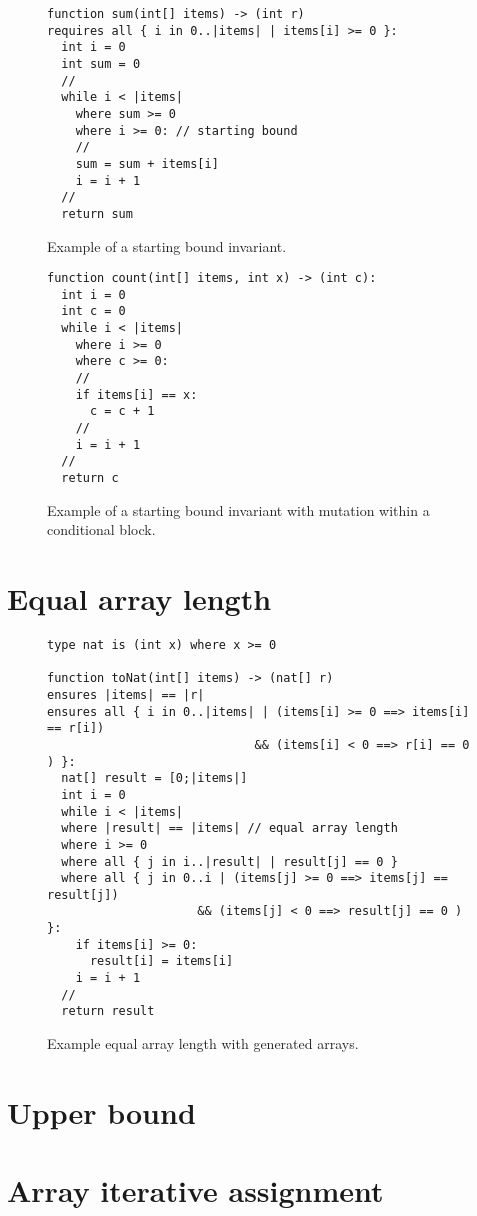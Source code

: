 \begin{appendices}
\begin{figure}[ht]
\begin{lstlisting}
function sum(int[] items) -> (int r)
requires all { i in 0..|items| | items[i] >= 0 }:
  int i = 0
  int sum = 0
  //
  while i < |items|
    where sum >= 0
    where i >= 0: // starting bound
    //
    sum = sum + items[i]
    i = i + 1
  //
  return sum
\end{lstlisting}
\caption{Example of a starting bound invariant.}
\end{figure}

\begin{figure}[ht]
\begin{lstlisting}
function count(int[] items, int x) -> (int c):
  int i = 0
  int c = 0
  while i < |items|
    where i >= 0
    where c >= 0:
    //
    if items[i] == x:
      c = c + 1
    //
    i = i + 1
  //
  return c
\end{lstlisting}
\caption{Example of a starting bound invariant with mutation within a conditional block.}
\end{figure}

\section{Equal array length}

\begin{figure}[ht]
\begin{lstlisting}
type nat is (int x) where x >= 0

function toNat(int[] items) -> (nat[] r)
ensures |items| == |r|
ensures all { i in 0..|items| | (items[i] >= 0 ==> items[i] == r[i])
                             && (items[i] < 0 ==> r[i] == 0 ) }:
  nat[] result = [0;|items|]
  int i = 0
  while i < |items|
  where |result| == |items| // equal array length
  where i >= 0
  where all { j in i..|result| | result[j] == 0 }
  where all { j in 0..i | (items[j] >= 0 ==> items[j] == result[j]) 
                     && (items[j] < 0 ==> result[j] == 0 ) }:
    if items[i] >= 0:
      result[i] = items[i]
    i = i + 1
  //
  return result
\end{lstlisting}
\caption{Example equal array length with generated arrays.}
\end{figure}

\section{Upper bound}

\section{Array iterative assignment}


\end{appendices}
